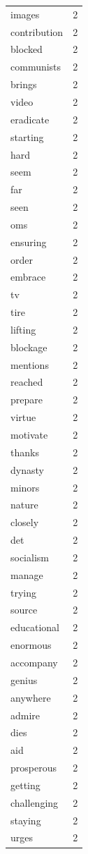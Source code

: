 \begin{tabular}{lr}
images & 2 \\
contribution & 2 \\
blocked & 2 \\
communists & 2 \\
brings & 2 \\
video & 2 \\
eradicate & 2 \\
starting & 2 \\
hard & 2 \\
seem & 2 \\
far & 2 \\
seen & 2 \\
oms & 2 \\
ensuring & 2 \\
order & 2 \\
embrace & 2 \\
tv & 2 \\
tire & 2 \\
lifting & 2 \\
blockage & 2 \\
mentions & 2 \\
reached & 2 \\
prepare & 2 \\
virtue & 2 \\
motivate & 2 \\
thanks & 2 \\
dynasty & 2 \\
minors & 2 \\
nature & 2 \\
closely & 2 \\
det & 2 \\
socialism & 2 \\
manage & 2 \\
trying & 2 \\
source & 2 \\
educational & 2 \\
enormous & 2 \\
accompany & 2 \\
genius & 2 \\
anywhere & 2 \\
admire & 2 \\
dies & 2 \\
aid & 2 \\
prosperous & 2 \\
getting & 2 \\
challenging & 2 \\
staying & 2 \\
urges & 2 \\

\end{tabular}
